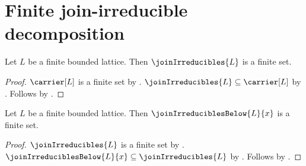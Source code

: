 \section{Finite join-irreducible decomposition}






\begin{proposition}\label{finite_join_irreducibles}
    Let $L$ be a finite bounded lattice.
    Then $\joinIrreducibles{L}$ is a finite set.
\end{proposition}
\begin{proof}
    $\carrier[L]$ is a finite set by .
    $\joinIrreducibles{L}\subseteq\carrier[L]$ by
        .
    Follows by .
\end{proof}

\begin{proposition}\label{finite_join_irreducibles_below}
    Let $L$ be a finite bounded lattice.
    Then $\joinIrreduciblesBelow{L}{x}$ is a finite set.
\end{proposition}
\begin{proof}
    $\joinIrreducibles{L}$ is a finite set by
        .
    $\joinIrreduciblesBelow{L}{x}\subseteq\joinIrreducibles{L}$ by
        .
    Follows by .
\end{proof}

